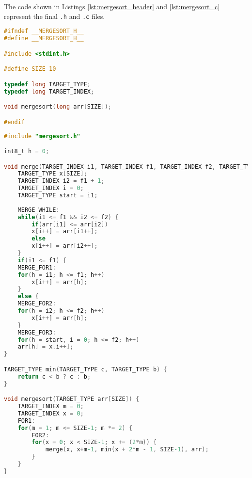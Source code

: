 The code shown in Listings \ref{lst:mergesort_header} and \ref{lst:mergesort_c} represent the final \texttt{.h} and \texttt{.c} files.

\bigskip

\begin{lstlisting}[label=lst:mergesort_header,caption=Mergesort Header File,language=C,tabsize=4]
#ifndef __MERGESORT_H__
#define __MERGESORT_H__

#include <stdint.h>

#define SIZE 10

typedef long TARGET_TYPE;
typedef long TARGET_INDEX;

void mergesort(long arr[SIZE]);

#endif
\end{lstlisting}

\newpage

\begin{lstlisting}[label=lst:mergesort_c,caption=Mergesort C File,language=C,tabsize=4]
#include "mergesort.h"

int8_t h = 0;

void merge(TARGET_INDEX i1, TARGET_INDEX f1, TARGET_INDEX f2, TARGET_TYPE arr[SIZE]) {
	TARGET_TYPE x[SIZE];
	TARGET_INDEX i2 = f1 + 1;
	TARGET_INDEX i = 0;
	TARGET_TYPE start = i1;
	
	MERGE_WHILE:
	while(i1 <= f1 && i2 <= f2) {
		if(arr[i1] <= arr[i2])
		x[i++] = arr[i1++];
		else
		x[i++] = arr[i2++];
	}	
	if(i1 <= f1) {
	MERGE_FOR1:
	for(h = i1; h <= f1; h++)
		x[i++] = arr[h];
	}
	else {
	MERGE_FOR2:
	for(h = i2;	h <= f2; h++)
		x[i++] = arr[h];
	}
	MERGE_FOR3:
	for(h = start, i = 0; h <= f2; h++)
	arr[h] = x[i++];
}

TARGET_TYPE min(TARGET_TYPE c, TARGET_TYPE b) {
	return c < b ? c : b;
}

void mergesort(TARGET_TYPE arr[SIZE]) {
	TARGET_INDEX m = 0;
	TARGET_INDEX x = 0;
	FOR1:
	for(m = 1; m <= SIZE-1; m *= 2) {
		FOR2:
		for(x = 0; x < SIZE-1; x += (2*m)) {
			merge(x, x+m-1, min(x + 2*m - 1, SIZE-1), arr);
		}
	}
}
\end{lstlisting}













